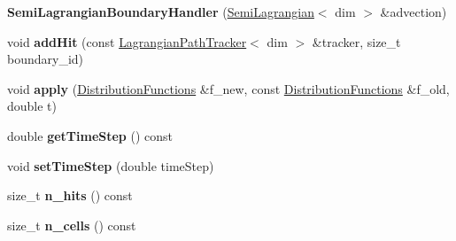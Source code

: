 \begin{DoxyCompactItemize}
\item 
\hypertarget{classnatrium_1_1SemiLagrangianBoundaryHandler_a54cb870dad6fb60cb7c71d606cc213b7}{
{\bfseries SemiLagrangianBoundaryHandler} (\hyperlink{classnatrium_1_1SemiLagrangian}{SemiLagrangian}$<$ dim $>$ \&advection)}
\label{classnatrium_1_1SemiLagrangianBoundaryHandler_a54cb870dad6fb60cb7c71d606cc213b7}

\item 
\hypertarget{classnatrium_1_1SemiLagrangianBoundaryHandler_a670c3a30fbde7200c0df9e68a31394f4}{
void {\bfseries addHit} (const \hyperlink{structnatrium_1_1LagrangianPathTracker}{LagrangianPathTracker}$<$ dim $>$ \&tracker, size\_\-t boundary\_\-id)}
\label{classnatrium_1_1SemiLagrangianBoundaryHandler_a670c3a30fbde7200c0df9e68a31394f4}

\item 
\hypertarget{classnatrium_1_1SemiLagrangianBoundaryHandler_adf15590774c689568e0d9e1b6147dc3d}{
void {\bfseries apply} (\hyperlink{classnatrium_1_1DistributionFunctions}{DistributionFunctions} \&f\_\-new, const \hyperlink{classnatrium_1_1DistributionFunctions}{DistributionFunctions} \&f\_\-old, double t)}
\label{classnatrium_1_1SemiLagrangianBoundaryHandler_adf15590774c689568e0d9e1b6147dc3d}

\item 
\hypertarget{classnatrium_1_1SemiLagrangianBoundaryHandler_a569e569580975ff6ba53a4252ee1779c}{
double {\bfseries getTimeStep} () const }
\label{classnatrium_1_1SemiLagrangianBoundaryHandler_a569e569580975ff6ba53a4252ee1779c}

\item 
\hypertarget{classnatrium_1_1SemiLagrangianBoundaryHandler_ab2cb0b7f808e41db489fec02b697f15a}{
void {\bfseries setTimeStep} (double timeStep)}
\label{classnatrium_1_1SemiLagrangianBoundaryHandler_ab2cb0b7f808e41db489fec02b697f15a}

\item 
\hypertarget{classnatrium_1_1SemiLagrangianBoundaryHandler_ae63b26af365aa53b29239007db243501}{
size\_\-t {\bfseries n\_\-hits} () const }
\label{classnatrium_1_1SemiLagrangianBoundaryHandler_ae63b26af365aa53b29239007db243501}

\item 
\hypertarget{classnatrium_1_1SemiLagrangianBoundaryHandler_a7707295a100a75a9bb3aaf03019060e1}{
size\_\-t {\bfseries n\_\-cells} () const }
\label{classnatrium_1_1SemiLagrangianBoundaryHandler_a7707295a100a75a9bb3aaf03019060e1}

\end{DoxyCompactItemize}


